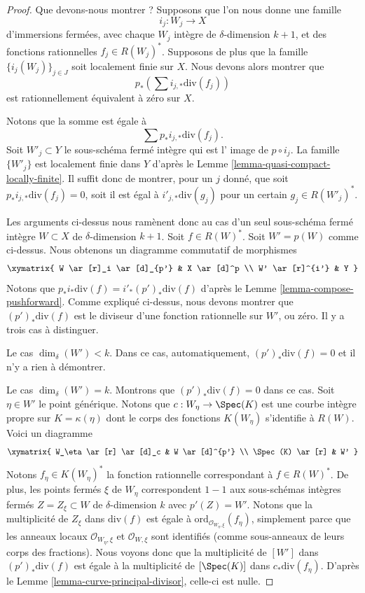 \begin{proof}
Que devons-nous montrer ? Supposons que l'on nous donne une famille
$$
i_j : W_j \longrightarrow X
$$
d'immersions fermées, avec chaque $W_j$ intègre de $\delta$-dimension $k + 1$,
et des fonctions rationnelles $f_j \in R(W_j)^*$.
Supposons de plus que
la famille $\{i_j(W_j)\}_{j \in J}$ soit localement finie sur $X$.
Nous devons alors montrer que
$$
p_*\left(\sum i_{j, *}\text{div}(f_j)\right)
$$
est rationnellement équivalent à zéro sur $X$.

\medskip\noindent
Notons que la somme est égale à
$$
\sum p_*i_{j, *}\text{div}(f_j).
$$
Soit $W'_j \subset Y$ le sous-schéma fermé intègre qui est l'
image de $p \circ i_j$. La famille $\{W'_j\}$ est localement finie
dans $Y$ d'après le Lemme \ref{lemma-quasi-compact-locally-finite}.
Il suffit donc de montrer, pour un $j$ donné, que soit
$p_*i_{j, *}\text{div}(f_j) = 0$, soit il
est égal à $i'_{j, *}\text{div}(g_j)$ pour un certain $g_j \in R(W'_j)^*$.

\medskip\noindent
Les arguments ci-dessus nous ramènent donc au cas d'un seul
sous-schéma fermé intègre $W \subset X$ de $\delta$-dimension $k + 1$.
Soit $f \in R(W)^*$. Soit $W' = p(W)$ comme ci-dessus.
Nous obtenons un diagramme commutatif de morphismes
$$
\xymatrix{
W \ar[r]_i \ar[d]_{p'} & X \ar[d]^p \\
W' \ar[r]^{i'} & Y
}
$$
Notons que $p_*i_*\text{div}(f) = i'_*(p')_*\text{div}(f)$ d'après le
Lemme \ref{lemma-compose-pushforward}. Comme expliqué ci-dessus,
nous devons montrer que $(p')_*\text{div}(f)$
est le diviseur d'une fonction rationnelle sur $W'$, ou zéro.
Il y a trois cas à distinguer.

\medskip\noindent
Le cas $\dim_\delta(W') < k$. Dans ce cas, automatiquement,
$(p')_*\text{div}(f) = 0$ et il n'y a rien à démontrer.

\medskip\noindent
Le cas $\dim_\delta(W') = k$. Montrons que $(p')_*\text{div}(f) = 0$
dans ce cas. Soit $\eta \in W'$ le point générique.
Notons que $c : W_\eta \to \Spec(K)$
est une courbe intègre propre sur $K = \kappa(\eta)$
dont le corps des fonctions $K(W_\eta)$ s'identifie à $R(W)$.
Voici un diagramme
$$
\xymatrix{
W_\eta \ar[r] \ar[d]_c & W \ar[d]^{p'} \\
\Spec(K) \ar[r] & W'
}
$$
Notons $f_\eta \in K(W_\eta)^*$ la fonction rationnelle
correspondant à $f \in R(W)^*$.
De plus, les points fermés $\xi$ de $W_\eta$ correspondent $1 - 1$ aux
sous-schémas intègres fermés $Z = Z_\xi \subset W$ de $\delta$-dimension $k$
avec $p'(Z) = W'$. Notons que la multiplicité
de $Z_\xi$ dans $\text{div}(f)$ est égale à
$\text{ord}_{\mathcal{O}_{W_\eta, \xi}}(f_\eta)$, simplement parce que les
anneaux locaux $\mathcal{O}_{W_\eta, \xi}$ et $\mathcal{O}_{W, \xi}$
sont identifiés (comme sous-anneaux de leurs corps des fractions).
Nous voyons donc que la multiplicité de $[W']$ dans
$(p')_*\text{div}(f)$ est égale à la multiplicité de
$[\Spec(K)]$ dans $c_*\text{div}(f_\eta)$.
D'après le Lemme \ref{lemma-curve-principal-divisor}, celle-ci est nulle.


\end{proof}
